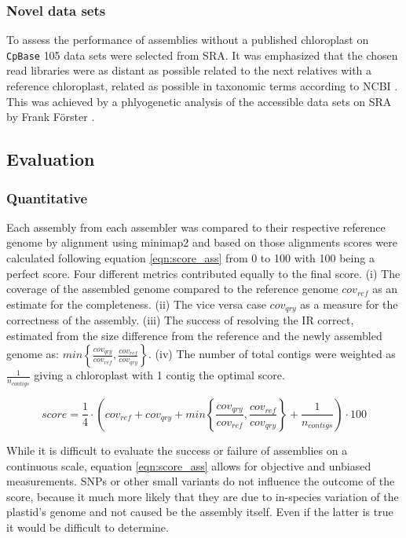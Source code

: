 \subsubsection{Novel data sets}

To assess the performance of assemblies without a published chloroplast on \texttt{CpBase} \cite{cpbase} 105
data sets were selected from SRA. It was emphasized that the chosen read libraries were as distant as possible
related to the next relatives with a reference chloroplast, related as possible in taxonomic terms according
to NCBI \cite{ncbitaxonomy}. This was achieved by a phlyogenetic analysis of the accessible data sets on SRA
by Frank F\"orster \cite{freudenthal2019landscape}.

\subsection{Evaluation}
\subsubsection{Quantitative}

Each assembly from each assembler was compared to their respective reference genome by alignment using
minimap2 \cite{li2018minimap2} and based on those alignments scores were calculated following equation
\ref{eqn:score_ass} from 0 to 100 with 100 being a perfect score. Four different metrics contributed equally
to the final score. (i) The coverage of the assembled genome compared to the reference genome $cov_{ref}$ as
an estimate for the completeness. (ii) The vice versa case $cov_{qry}$ as a measure for the correctness of the
assembly. (iii) The success of resolving the IR correct, estimated from the size difference from the reference
and the newly assembled genome as:
$min\left\{ \frac{cov_{qry}}{cov_{ref}}, \frac{cov_{ref}}{cov_{qry}}\right\}$.  (iv) The number of total
contigs were weighted as $\frac{1}{n_{contigs}}$ giving a chloroplast with 1 contig the optimal score.

\begin{equation}
  score = \frac{1}{4} \cdot \left( cov_{ref} +  cov_{qry} + min\left\{ \frac{cov_{qry}}{cov_{ref}}, \frac{cov_{ref}}{cov_{qry}}\right\} + \frac{1}{n_{contigs} }\right) \cdot 100
  \label{eqn:score_ass}
\end{equation}

While it is difficult to evaluate the success or failure of assemblies on a continuous scale, equation
\ref{eqn:score_ass} allows for objective and unbiased measurements. SNPs or other small variants do not
influence the outcome of the score, because it much more likely that they are due to in-species variation of
the plastid's genome and not caused be the assembly itself. Even if the latter is true it would be difficult
to determine.
  
